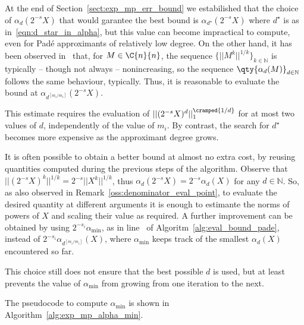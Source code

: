 At the end of Section~\ref{sect:exp_mp_err_bound} we estabilished that the choice of $\alpha_d(2^{-s}X)$ that would garantee the best bound is $\alpha_{d^{\star}}(2^{-s}X)$ where $d^{\star}$ is as in~\eqref{eqn:d_star_in_alpha}, but this value can become impractical to compute, even for Padé approximants of relatively low degree. On the other hand, it has been observed in~\cite{higham:alhi09_new} that, for $M\in\C{n}{n}$, the sequence $\{\lvert\lvert M^k\rvert\rvert^{1/k}\}_{k\in\mathbb{N}}$ is typically -- though not always -- nonincreasing, so the sequence $\qty{\alpha_d(M)}_{d\in\mathbb{N}}$ follows the same behaviour, typically. Thus, it is reasonable to evaluate the bound at $\alpha_{d^{[m_i/m_i]}}(2^{-s}X)$.
\begin{oss*}
	This estimate requires the evaluation of $\lvert\lvert(2^{-s}X)^d\rvert\rvert^{\cramped{1/d}}_1$ for at most two values of $d$, independently of the value of $m_i$. By contrast, the search for $d^{\star}$ becomes more expensive as the approximant degree grows.
\end{oss*}
It is often possible to obtain a better bound at almost no extra cost, by reusing quantities computed during the previous steps of the algorithm. Observe that $\lvert\lvert(2^{-s}X)^{k}\rvert\rvert^{1/k}=2^{-s}\lvert\lvert X^k\rvert\rvert^{1/k}$, thus $\alpha_d(2^{-s}X)=2^{-s}\alpha_d(X)$ for any $d\in\mathbb{N}$. So, as also observed in Remark~\ref{oss:denominator_eval_point}, to evaluate the desired quantity at different arguments it is enough to estimante the norms of powers of $X$ and scaling their value as required. A further improvement can be obtained by using $2^{-s_i}\alpha_{\min}$, as in line~ of Algoritm~\ref{alg:eval_bound_pade}, instead of $2^{-s_i}\alpha_{d^{[m_i/m_i]}}(X)$, where $\alpha_{\min}$ keeps track of the smallest $\alpha_d(X)$ encountered so far. 
\begin{oss*}
	This choice still does not ensure that the best possible $d$ is used, but at least prevents the value of $\alpha_{\min}$ from growing from one iteration to the next.
\end{oss*}
The pseudocode to compute $\alpha_{\min}$ is shown in Algorithm~\ref{alg:exp_mp_alpha_min}. 
